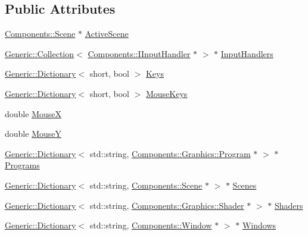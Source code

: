 \subsection*{Public Attributes}
\begin{DoxyCompactItemize}
\item 
\mbox{\hyperlink{classEngine_1_1Components_1_1Scene}{Components\+::\+Scene}} $\ast$ \mbox{\hyperlink{classEngine_1_1BaseEngine_adb3dbc839da9d821e08b18d8a221698d}{Active\+Scene}}
\item 
\mbox{\hyperlink{classGeneric_1_1Collection}{Generic\+::\+Collection}}$<$ \mbox{\hyperlink{namespaceEngine_1_1Components_ac8d3da616707b57e065fd62e6701415f}{Components\+::\+I\+Input\+Handler}} $\ast$ $>$ $\ast$ \mbox{\hyperlink{classEngine_1_1BaseEngine_a134fa082c5a64d62b76ddf926647e7cc}{Input\+Handlers}}
\item 
\mbox{\hyperlink{classGeneric_1_1Dictionary}{Generic\+::\+Dictionary}}$<$ short, bool $>$ \mbox{\hyperlink{classEngine_1_1BaseEngine_a65321a97e83f0a6ee90df3efac2d3307}{Keys}}
\item 
\mbox{\hyperlink{classGeneric_1_1Dictionary}{Generic\+::\+Dictionary}}$<$ short, bool $>$ \mbox{\hyperlink{classEngine_1_1BaseEngine_a3ee2bdddb66d45b8c808ffd937ba9c50}{Mouse\+Keys}}
\item 
double \mbox{\hyperlink{classEngine_1_1BaseEngine_a5fe085152ebe93346900407f6b41a034}{MouseX}}
\item 
double \mbox{\hyperlink{classEngine_1_1BaseEngine_a143c9c32dbbdc70bf1546ffe275bf384}{MouseY}}
\item 
\mbox{\hyperlink{classGeneric_1_1Dictionary}{Generic\+::\+Dictionary}}$<$ std\+::string, \mbox{\hyperlink{classEngine_1_1Components_1_1Graphics_1_1Program}{Components\+::\+Graphics\+::\+Program}} $\ast$ $>$ $\ast$ \mbox{\hyperlink{classEngine_1_1BaseEngine_ae0f86360ea3a384caefe443dd8f88601}{Programs}}
\item 
\mbox{\hyperlink{classGeneric_1_1Dictionary}{Generic\+::\+Dictionary}}$<$ std\+::string, \mbox{\hyperlink{classEngine_1_1Components_1_1Scene}{Components\+::\+Scene}} $\ast$ $>$ $\ast$ \mbox{\hyperlink{classEngine_1_1BaseEngine_afd02af3c2fbe9bb734db014dec06585a}{Scenes}}
\item 
\mbox{\hyperlink{classGeneric_1_1Dictionary}{Generic\+::\+Dictionary}}$<$ std\+::string, \mbox{\hyperlink{classEngine_1_1Components_1_1Graphics_1_1Shader}{Components\+::\+Graphics\+::\+Shader}} $\ast$ $>$ $\ast$ \mbox{\hyperlink{classEngine_1_1BaseEngine_a2582dee3f73da82bb422b43317b85e3b}{Shaders}}
\item 
\mbox{\hyperlink{classGeneric_1_1Dictionary}{Generic\+::\+Dictionary}}$<$ std\+::string, \mbox{\hyperlink{classEngine_1_1Components_1_1Window}{Components\+::\+Window}} $\ast$ $>$ $\ast$ \mbox{\hyperlink{classEngine_1_1BaseEngine_a4a1a4c4dae052e66ecc4f326eeed4d33}{Windows}}
\end{DoxyCompactItemize}
